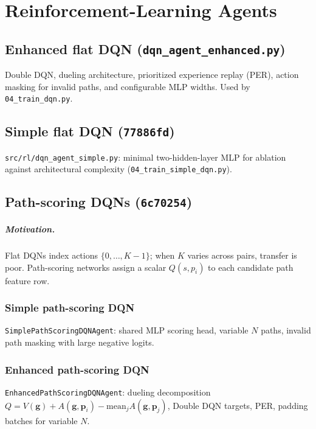 \documentclass[11pt,a4paper,twoside,openright]{report}
\begin{document}
\chapter{Reinforcement-Learning Agents}

\section{Enhanced flat DQN (\texttt{dqn\_agent\_enhanced.py})}

Double DQN, dueling architecture, prioritized experience replay (PER), action masking
for invalid paths, and configurable MLP widths. Used by \texttt{04\_train\_dqn.py}.

\section{Simple flat DQN (\texttt{77886fd})}

\texttt{src/rl/dqn\_agent\_simple.py}: minimal two-hidden-layer MLP for ablation
against architectural complexity (\texttt{04\_train\_simple\_dqn.py}).

\section{Path-scoring DQNs (\texttt{6c70254})}

\paragraph{Motivation.}
Flat DQNs index actions $\{0,\ldots,K{-}1\}$; when $K$ varies across pairs, transfer
is poor. Path-scoring networks assign a scalar $Q(s, p_i)$ to each candidate path
feature row.

\subsection{Simple path-scoring DQN}
\texttt{SimplePathScoringDQNAgent}: shared MLP scoring head, variable $N$ paths,
invalid path masking with large negative logits.

\subsection{Enhanced path-scoring DQN}
\texttt{EnhancedPathScoringDQNAgent}: dueling decomposition
$Q = V(\mathbf{g}) + A(\mathbf{g}, \mathbf{p}_i) - \mathrm{mean}_j A(\mathbf{g}, \mathbf{p}_j)$,
Double DQN targets, PER, padding batches for variable $N$.
\end{document}
